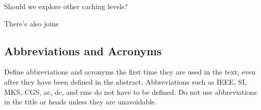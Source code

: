 \documentclass[conference]{IEEEtran}
\begin{document}
Should we explore other caching levels?

There's also joins
























\subsection{Abbreviations and Acronyms}\label{AA}
Define abbreviations and acronyms the first time they are used in the text, 
even after they have been defined in the abstract. Abbreviations such as 
IEEE, SI, MKS, CGS, ac, dc, and rms do not have to be defined. Do not use 
abbreviations in the title or heads unless they are unavoidable.

\end{document}
